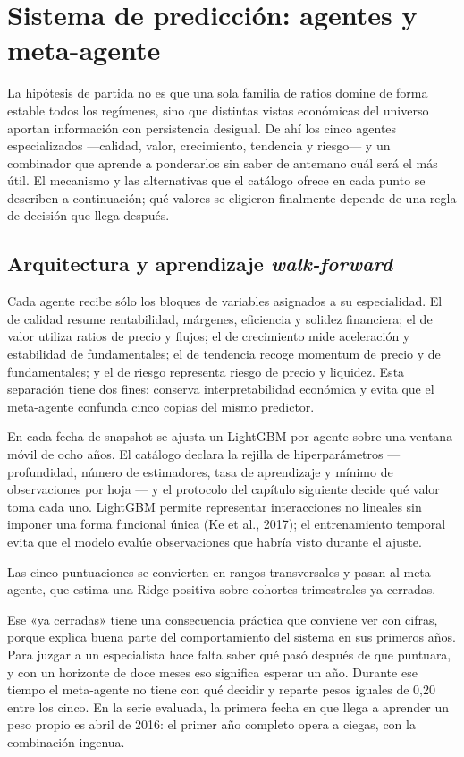\chapter{Sistema de predicción: agentes y meta-agente}
\label{chap:agentes}

La hipótesis de partida no es que una sola familia de ratios domine de forma estable todos los
regímenes, sino que distintas vistas económicas del universo aportan información con persistencia
desigual. De ahí los cinco agentes especializados ---calidad, valor, crecimiento, tendencia y
riesgo--- y un combinador que aprende a ponderarlos sin saber de antemano cuál será el más útil.
El mecanismo y las alternativas que el catálogo ofrece en cada punto se describen a continuación;
qué valores se eligieron finalmente depende de una regla de decisión que llega después.

\section{Arquitectura y aprendizaje \textit{walk-forward}}

Cada agente recibe sólo los bloques de variables asignados a su especialidad. El de calidad resume
rentabilidad, márgenes, eficiencia y solidez financiera; el de valor utiliza ratios de precio y
flujos; el de crecimiento mide aceleración y estabilidad de fundamentales; el de tendencia recoge
momentum de precio y de fundamentales; y el de riesgo representa riesgo de precio y liquidez. Esta separación tiene dos fines: conserva interpretabilidad económica y evita que el
meta-agente confunda cinco copias del mismo predictor.

En cada fecha de snapshot se ajusta un LightGBM por agente sobre una ventana móvil de ocho años. El
catálogo declara la rejilla de hiperparámetros --- profundidad, número de estimadores, tasa de
aprendizaje y mínimo de observaciones por hoja --- y el protocolo del capítulo siguiente decide qué
valor toma cada uno. LightGBM permite representar interacciones no lineales sin imponer una forma
funcional única (Ke et al., 2017); el entrenamiento temporal evita que el modelo evalúe
observaciones que habría visto durante el ajuste.

Las cinco puntuaciones se convierten en rangos transversales y pasan al meta-agente, que estima una
Ridge positiva sobre cohortes trimestrales ya cerradas.

Ese «ya cerradas» tiene una consecuencia práctica que conviene ver con cifras, porque explica buena
parte del comportamiento del sistema en sus primeros años. Para juzgar a un especialista hace falta
saber qué pasó después de que puntuara, y con un horizonte de doce meses eso significa esperar un
año. Durante ese tiempo el meta-agente no tiene con qué decidir y reparte pesos iguales de 0,20 entre
los cinco. En la serie evaluada, la primera fecha en que llega a aprender un peso propio es
abril de 2016: el primer año completo opera a ciegas, con la combinación ingenua.

